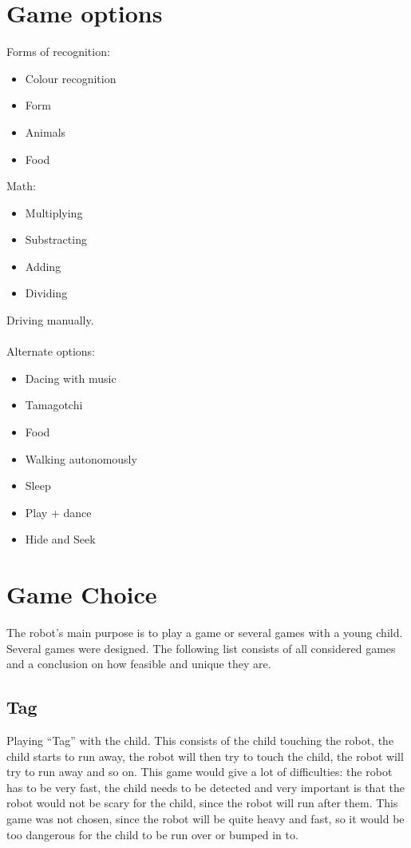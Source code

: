 \documentclass[11pt,twoside,a4paper]{report}
\begin{document}
\section{Game options}
Forms of recognition:
\begin{itemize}
\item Colour recognition
\item Form
\item Animals
\item Food
\end{itemize}
Math:
\begin{itemize}
\item Multiplying
\item Substracting
\item Adding
\item Dividing
\end{itemize}
Driving manually. \\
\\
Alternate options:
\begin{itemize}
\item Dacing with music
\item Tamagotchi
\item Food
\item Walking autonomously
\item Sleep
\item Play + dance
\item Hide and Seek
\end{itemize}
\section{Game Choice}
The robot’s main purpose is to play a game or several games with a young child. Several games were designed. The following list consists of all considered games and a conclusion on how feasible and unique they are.
\subsection{Tag}
Playing “Tag” with the child. This consists of the child touching the robot, the child starts to run away, the robot will then try to touch the child, the robot will try to run away and so on.
This game would give a lot of difficulties: the robot has to be very fast, the child needs to be detected and very important is that the robot would not be scary for the child, since the robot will run after them. This game was not chosen, since the robot will be quite heavy and fast, so it would be too dangerous for the child to be run over or bumped in to.
\end{document}
